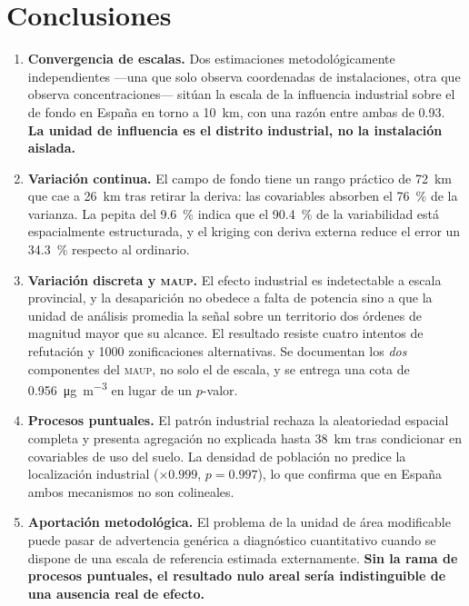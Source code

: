\documentclass[11pt,a4paper]{article}
\begin{document}
\section{Conclusiones}

\begin{enumerate}[leftmargin=1.6em, itemsep=4pt]
  \item \textbf{Convergencia de escalas.} Dos estimaciones metodológicamente
  independientes —una que solo observa coordenadas de instalaciones, otra que
  observa concentraciones— sitúan la escala de la influencia industrial sobre
  el  de fondo en España en torno a \SI{10}{\kilo\metre}, con una razón
  entre ambas de \num{0.93}. \textbf{La unidad de influencia es el distrito
  industrial, no la instalación aislada.}

  \item \textbf{Variación continua.} El campo de fondo tiene un rango práctico
  de \SI{72}{\kilo\metre} que cae a \SI{26}{\kilo\metre} tras retirar la
  deriva: las covariables absorben el \SI{76}{\percent} de la varianza. La
  pepita del \SI{9.6}{\percent} indica que el \SI{90.4}{\percent} de la
  variabilidad está espacialmente estructurada, y el kriging con deriva externa
  reduce el error un \SI{34.3}{\percent} respecto al ordinario.

  \item \textbf{Variación discreta y \textsc{maup}.} El efecto industrial es
  indetectable a escala provincial, y la desaparición no obedece a falta de
  potencia sino a que la unidad de análisis promedia la señal sobre un
  territorio dos órdenes de magnitud mayor que su alcance. El resultado resiste
  cuatro intentos de refutación y \num{1000} zonificaciones alternativas. Se
  documentan los \emph{dos} componentes del \textsc{maup}, no solo el de
  escala, y se entrega una cota de
  \SI{0.956}{\micro\gram\per\cubic\metre} en lugar de un $p$-valor.

  \item \textbf{Procesos puntuales.} El patrón industrial rechaza la
  aleatoriedad espacial completa y presenta agregación no explicada hasta
  \SI{38}{\kilo\metre} tras condicionar en covariables de uso del suelo. La
  densidad de población no predice la localización industrial
  ($\times\num{0.999}$, $p=\num{0.997}$), lo que confirma que en España ambos
  mecanismos no son colineales.

  \item \textbf{Aportación metodológica.} El problema de la unidad de área
  modificable puede pasar de advertencia genérica a diagnóstico cuantitativo
  cuando se dispone de una escala de referencia estimada externamente.
  \textbf{Sin la rama de procesos puntuales, el resultado nulo areal sería
  indistinguible de una ausencia real de efecto.}
\end{enumerate}
\end{document}
